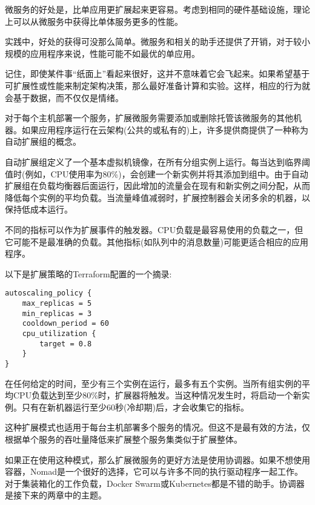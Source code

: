 
微服务的好处是，比单应用更扩展起来更容易。考虑到相同的硬件基础设施，理论上可以从微服务中获得比单体服务更多的性能。

实践中，好处的获得可没那么简单。微服务和相关的助手还提供了开销，对于较小规模的应用程序来说，性能可能不如最优的单应用。

记住，即使某件事“纸面上”看起来很好，这并不意味着它会飞起来。如果希望基于可扩展性或性能来制定架构决策，那么最好准备计算和实验。这样，相应的行为就会基于数据，而不仅仅是情绪。


对于每个主机部署一个服务，扩展微服务需要添加或删除托管该微服务的其他机器。如果应用程序运行在云架构(公共的或私有的)上，许多提供商提供了一种称为自动扩展组的概念。

自动扩展组定义了一个基本虚拟机镜像，在所有分组实例上运行。每当达到临界阈值时(例如，CPU使用率为80\%)，会创建一个新实例并将其添加到组中。由于自动扩展组在负载均衡器后面运行，因此增加的流量会在现有和新实例之间分配，从而降低每个实例的平均负载。当流量峰值减弱时，扩展控制器会关闭多余的机器，以保持低成本运行。

不同的指标可以作为扩展事件的触发器。CPU负载是最容易使用的负载之一，但它可能不是最准确的负载。其他指标(如队列中的消息数量)可能更适合相应的应用程序。

以下是扩展策略的Terraform配置的一个摘录:

\begin{lstlisting}[style=styleCXX]
autoscaling_policy {
	max_replicas = 5
	min_replicas = 3
	cooldown_period = 60
	cpu_utilization {
		target = 0.8
	}
}
\end{lstlisting}

在任何给定的时间，至少有三个实例在运行，最多有五个实例。当所有组实例的平均CPU负载达到至少80\%时，扩展器将触发。当这种情况发生时，将启动一个新实例。只有在新机器运行至少60秒(冷却期)后，才会收集它的指标。


这种扩展模式也适用于每台主机部署多个服务的情况。但这不是最有效的方法，仅根据单个服务的吞吐量降低来扩展整个服务集类似于扩展整体。

如果正在使用这种模式，那么扩展微服务的更好方法是使用协调器。如果不想使用容器，Nomad是一个很好的选择，它可以与许多不同的执行驱动程序一起工作。对于集装箱化的工作负载，Docker Swarm或Kubernetes都是不错的助手。协调器是接下来的两章中的主题。






